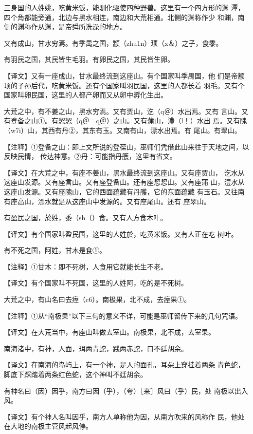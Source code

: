\documentclass[a4paper,12pt,UTF8,twoside]{ctexbook}
\begin{document}
三身国的人姓姚，吃黄米饭，能驯化驱使四种野兽。这里有一个四方形的渊 潭，四个角都能旁通，北边与黑水相连，南边和大荒相通。北侧的渊称作少 和渊，南侧的渊称作从渊，是帝舜所洗澡的地方。

又有成山，甘水穷焉。有季禺之国，颛（zhu1n）顼（x＆）之子，食黍。

有羽民之国，其民皆生毛羽。有卵民之国，其民皆生卵。

【译文】又有一座成山，甘水最终流到这座山。有个国家叫季禺国，他 们是帝颛顼的子孙后代，吃黄米饭。还有个国家叫羽民国，这里的人都长着 羽毛。又有个国家叫卵民国，这里的人都产卵而又从卵中孵化生出。

大荒之中，有不姜之山，黑水穷焉。又有贾山，汔（q＠）水出焉。又有 言山。又有登备之山①。有恝恝（q＠　q＠）之山。又有蒲山，澧（l！）水出 焉。又有隗（w7i）山，其西有丹②，其东有玉。又南有山，漂水出焉。有 尾山。有翠山。

【注释】①登备之山：即上文所说的登葆山，巫师们凭借此山来往于天地之间，以反映民情， 传达神意。②丹：可能指丹雘，这里有省文。

【译文】在大荒之中，有座不姜山，黑水最终流到这座山。又有座贾山， 汔水从这座山发源。又有座言山。又有座登备山。还有座恝恝山。又有座蒲 山，澧水从这座山发源。又有座隗山，它的西面蕴藏有丹雘，它的东面蕴藏 有玉石。又往南有座高山，漂水就是从这座山中发源的。又有座尾山。还有 座翠山。

有盈民之国，於姓，黍（sh（）食。又有人方食木叶。

【译文】有个国家叫盈民国，这里的人姓於，吃黄米饭。又有人正在吃 树叶。

有不死之国，阿姓，甘木是食①。

【注释】①甘木：即不死树，人食用它就能长生不老。

【译文】有个国家叫不死国，这里的人姓阿，吃的是不死树。

大荒之中，有山名曰去痓（c6）。南极果，北不成，去痓果①。

【注释】①从“南极果”以下三句的意义不详，可能是巫师留传下来的几句咒语。

【译文】在大荒当中，有座山叫做去室山。南极果，北不成，去室果。

南海渚中，有神，人面，珥两青蛇，践两赤蛇，曰不廷胡余。

【译文】在南海的岛屿上，有一个神，是人的面孔，耳朵上穿挂着两条 青色蛇，脚底下踩踏着两条红色蛇，这个神叫不廷胡余。

有神名曰（因）因乎，南方曰因（乎），（夸）［来］风曰（乎）民，处 南极以出入风。

【译文】有个神人名叫因乎，南方人单称他为因，从南方吹来的风称作 民，他处在大地的南极主管风起风停。
\end{document}
